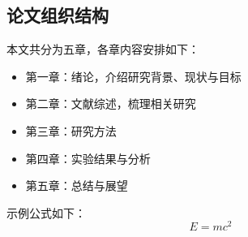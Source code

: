\subsection{论文组织结构}
\label{sec:structure}

本文共分为五章，各章内容安排如下：
\begin{itemize}
  \item 第一章：绪论，介绍研究背景、现状与目标
  \item 第二章：文献综述，梳理相关研究
  \item 第三章：研究方法
  \item 第四章：实验结果与分析
  \item 第五章：总结与展望
\end{itemize}

示例公式如下：
\begin{equation}
  E = mc^2
  \label{eq:example}
\end{equation}
